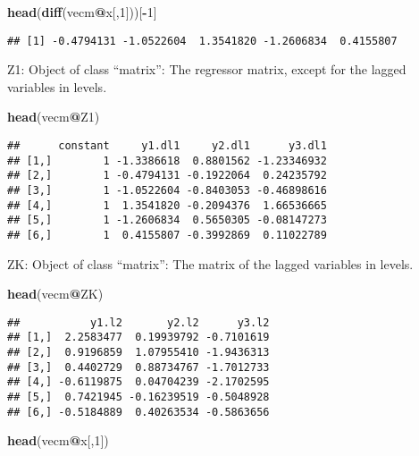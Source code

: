 \documentclass[]{book}
\newenvironment{Shaded}{\begin{snugshade}}{\end{snugshade}}
\newcommand{\KeywordTok}[1]{\textcolor[rgb]{0.13,0.29,0.53}{\textbf{#1}}}
\newcommand{\DecValTok}[1]{\textcolor[rgb]{0.00,0.00,0.81}{#1}}
\newcommand{\OperatorTok}[1]{\textcolor[rgb]{0.81,0.36,0.00}{\textbf{#1}}}
\newcommand{\NormalTok}[1]{#1}
\theoremstyle{definition}
\theoremstyle{definition}
\theoremstyle{definition}
\theoremstyle{remark}
\begin{document}
\begin{Shaded}
\begin{Highlighting}[]
\KeywordTok{head}\NormalTok{(}\KeywordTok{diff}\NormalTok{(vecm}\OperatorTok{@}\NormalTok{x[,}\DecValTok{1}\NormalTok{]))[}\OperatorTok{-}\DecValTok{1}\NormalTok{]}
\end{Highlighting}
\end{Shaded}

\begin{verbatim}
## [1] -0.4794131 -1.0522604  1.3541820 -1.2606834  0.4155807
\end{verbatim}

Z1: Object of class ``matrix'': The regressor matrix, except for the
lagged variables in levels.

\begin{Shaded}
\begin{Highlighting}[]
\KeywordTok{head}\NormalTok{(vecm}\OperatorTok{@}\NormalTok{Z1)}
\end{Highlighting}
\end{Shaded}

\begin{verbatim}
##      constant     y1.dl1     y2.dl1      y3.dl1
## [1,]        1 -1.3386618  0.8801562 -1.23346932
## [2,]        1 -0.4794131 -0.1922064  0.24235792
## [3,]        1 -1.0522604 -0.8403053 -0.46898616
## [4,]        1  1.3541820 -0.2094376  1.66536665
## [5,]        1 -1.2606834  0.5650305 -0.08147273
## [6,]        1  0.4155807 -0.3992869  0.11022789
\end{verbatim}

ZK: Object of class ``matrix'': The matrix of the lagged variables in
levels.

\begin{Shaded}
\begin{Highlighting}[]
\KeywordTok{head}\NormalTok{(vecm}\OperatorTok{@}\NormalTok{ZK)}
\end{Highlighting}
\end{Shaded}

\begin{verbatim}
##           y1.l2       y2.l2      y3.l2
## [1,]  2.2583477  0.19939792 -0.7101619
## [2,]  0.9196859  1.07955410 -1.9436313
## [3,]  0.4402729  0.88734767 -1.7012733
## [4,] -0.6119875  0.04704239 -2.1702595
## [5,]  0.7421945 -0.16239519 -0.5048928
## [6,] -0.5184889  0.40263534 -0.5863656
\end{verbatim}

\begin{Shaded}
\begin{Highlighting}[]
\KeywordTok{head}\NormalTok{(vecm}\OperatorTok{@}\NormalTok{x[,}\DecValTok{1}\NormalTok{])}
\end{Highlighting}
\end{Shaded}
\end{document}
